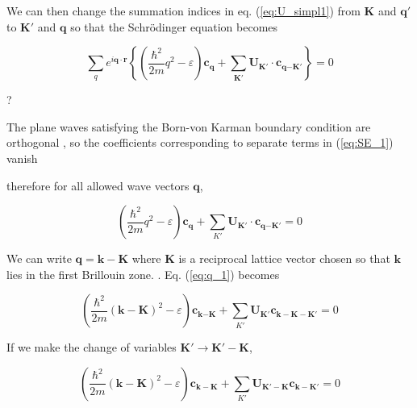 	We can then change the summation indices in eq. (\ref{eq:U_simpl1}) from $\mathbf{K}$ and $\mathbf{q'}$ to $\mathbf{K'}$ and $\mathbf{q}$ so that the Schrödinger equation becomes

	\begin{equation} \label{eq:SE_1}
		\sum_{q} e^{i\mathbf{q}\cdot\mathbf{r}}
		\left\{
		\left(
		\frac{\hbar^2}{2m} q^2 - \varepsilon
		\right) \boldsymbol{c}_{\mathbf{q}}
		+ \sum_{\mathbf{K'}} \boldsymbol{U}_{\mathbf{K'}}
		\cdot \boldsymbol{c}_\mathbf{q {-K'}}
		\right\}
		= 0
	\end{equation}

	?

	The plane waves satisfying the Born-von Karman boundary condition are orthogonal , so the coefficients corresponding to separate terms in (\ref{eq:SE_1}) vanish 

	therefore for all allowed wave vectors $\mathbf{q}$,

	\begin{equation} \label{eq:q_1}
		\left(
		\frac{\hbar^2}{2m} q^2
		- \varepsilon
		\right) \boldsymbol{c}_{\mathbf{q}}
		+ \sum_{K'} \boldsymbol{U}_\mathbf{K'}
		\cdot \boldsymbol{c}_\mathbf{q{-K'}}
		= 0
	\end{equation}

	We can write $\mathbf{q=k-K}$ where $\mathbf{K}$ is a reciprocal lattice vector chosen so that $\mathbf{k}$ lies in the first Brillouin zone. . Eq. (\ref{eq:q_1}) becomes

	\begin{equation} \label{eq:q_2}
		\left(
		\frac{\hbar^2}{2m}
		(\mathbf{k} - \mathbf{K})^2 - \varepsilon
		\right) \boldsymbol{c}_{\mathbf{k {-K}}}
		+ \sum_{K'} \boldsymbol{U}_\mathbf{K'}
		\boldsymbol{c}_\mathbf{k-K-K'}
		= 0
	\end{equation}

	If we make the change of variables  $\mathbf{K'}\rightarrow \mathbf{K'-K}$,

	\begin{equation} \label{eq:SE_momentum}
		\left(
		\frac{\hbar^2}{2m}
		(\mathbf{k-\mathbf{K}})^2 - \varepsilon
		\right) \boldsymbol{c}_{\mathbf{k-K}}
		+ \sum_{K'} \boldsymbol{U}_{\mathbf{K'-K}}
		\boldsymbol{c}_{\mathbf{k-K'}}
		= 0
	\end{equation}


